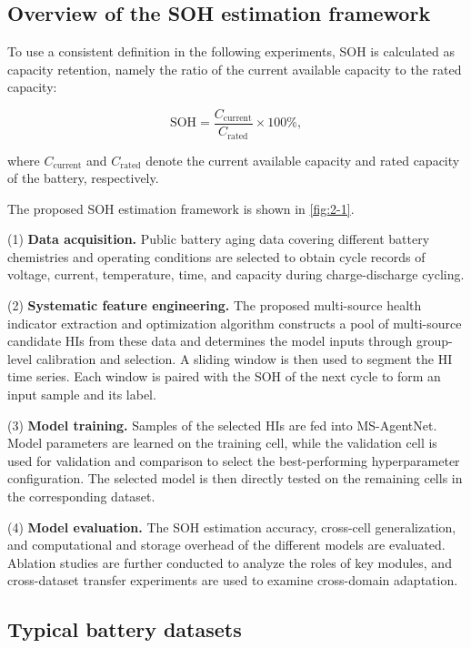 \subsection{Overview of the SOH estimation framework}

To use a consistent definition in the following experiments, SOH is calculated as capacity retention, namely the ratio of the current available capacity to the rated capacity\cite{ref13,ref14}:

\begin{equation}
\mathrm{SOH}=\frac{C_{\mathrm{current}}}{C_{\mathrm{rated}}}\times100\%,
\end{equation}

where $C_{\mathrm{current}}$ and $C_{\mathrm{rated}}$ denote the current available capacity and rated capacity of the battery, respectively.

The proposed SOH estimation framework is shown in \cref{fig:2-1}.

(1) \textbf{Data acquisition.} Public battery aging data covering different battery chemistries and operating conditions are selected to obtain cycle records of voltage, current, temperature, time, and capacity during charge-discharge cycling.

(2) \textbf{Systematic feature engineering.} The proposed multi-source health indicator extraction and optimization algorithm constructs a pool of multi-source candidate HIs from these data and determines the model inputs through group-level calibration and selection. A sliding window is then used to segment the HI time series. Each window is paired with the SOH of the next cycle to form an input sample and its label.

(3) \textbf{Model training.} Samples of the selected HIs are fed into MS-AgentNet. Model parameters are learned on the training cell, while the validation cell is used for validation and comparison to select the best-performing hyperparameter configuration. The selected model is then directly tested on the remaining cells in the corresponding dataset.

(4) \textbf{Model evaluation.} The SOH estimation accuracy, cross-cell generalization, and computational and storage overhead of the different models are evaluated. Ablation studies are further conducted to analyze the roles of key modules, and cross-dataset transfer experiments are used to examine cross-domain adaptation.

\subsection{Typical battery datasets}

